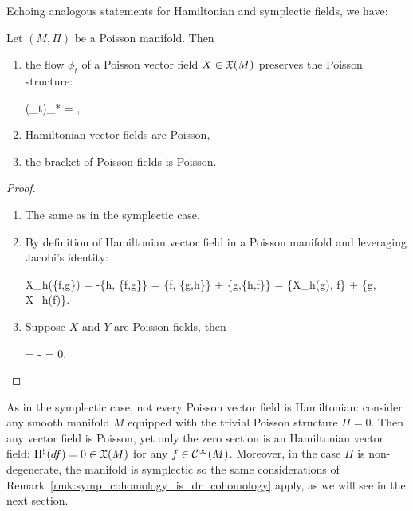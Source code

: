 Echoing analogous statements for Hamiltonian and symplectic fields, we have:

\begin{theorem}
	Let $(M,\Pi)$ be a Poisson manifold. Then
	\begin{enumerate}
		\item the flow $\phi_t$ of a Poisson vector field $X \in \mathfrak{X}(M)$ preserves the Poisson structure:
		\begin{eqalign}
			(\phi_t)_* \Pi = \Pi,
		\end{eqalign}
		\item Hamiltonian vector fields are Poisson,
		\item the bracket of Poisson fields is Poisson.
	\end{enumerate}
\end{theorem}
\begin{proof}
	\leavevmode
	\begin{enumerate}
		\item The same as in the symplectic case.
		\item By definition of Hamiltonian vector field in a Poisson manifold and leveraging Jacobi's identity:
		\begin{eqalign}
			X_h(\{f,g\}) = -\{h, \{f,g\}\} = \{f, \{g,h\}\} + \{g,\{h,f\}\} = \{X_h(g), f\} + \{g, X_h(f)\}.
		\end{eqalign}
		\item Suppose $X$ and $Y$ are Poisson fields, then
		\begin{eqalign}
			\Lie{[X,Y]}\Pi = \Lie{Y}\Pi - \Pi = 0.
		\end{eqalign}
	\end{enumerate}
\end{proof}

\begin{remark}
	As in the symplectic case, not every Poisson vector field is Hamiltonian: consider any smooth manifold $M$ equipped with the trivial Poisson structure $\Pi=0$. Then any vector field is Poisson, yet only the zero section is an Hamiltonian vector field: $\Pi^\sharp(df) = 0 \in \mathfrak{X}(M)$ for any $f \in \mathcal{C}^\infty(M)$. Moreover, in the case $\Pi$ is non-degenerate, the manifold is symplectic so the same considerations of Remark~\ref{rmk:symp_cohomology_is_dr_cohomology} apply, as we will see in the next section.
\end{remark}


